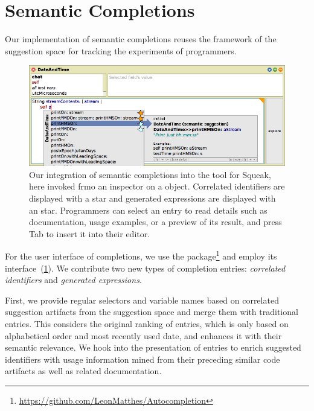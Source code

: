 
\section{Semantic Completions}
\label{sec:implementation/completions}

Our implementation of semantic completions reuses the framework of the suggestion space for tracking the experiments of programmers.

\begin{figure}
	\centering
	\includegraphics[width=\textwidth]{02_completions/screenshot.png} %
	\caption[Our integration of semantic completions into the  tool for Squeak.]{
		Our integration of semantic completions into the  tool for Squeak, here invoked frmo an inspector on a  object.
		Correlated identifiers are displayed with a \bold{\textcolor[HTML]{598db3}{blue}} star and generated expressions are displayed with an \bold{\textcolor{orange!80!black}{orange}} star.
		Programmers can select an entry to read details such as documentation, usage examples, or a preview of its result, and press Tab to insert it into their editor.
	}
	\label{fig:implementation/completions}
\end{figure}

For the user interface of completions, we use the  package\footnote{\url{https://github.com/LeonMatthes/Autocompletion}} and employ its  interface~(\cref{fig:implementation/completions}).
We contribute two new types of completion entries: \emph{correlated identifiers} and \emph{generated expressions}.

First, we provide regular selectors and variable names based on correlated suggestion artifacts from the suggestion space and merge them with traditional  entries.
This considers the original ranking of entries, which is only based on alphabetical order and most recently used date, and enhances it with their semantic relevance.
We hook into the presentation of entries to enrich suggested identifiers with usage information mined from their preceding similar code artifacts as well as related documentation.

